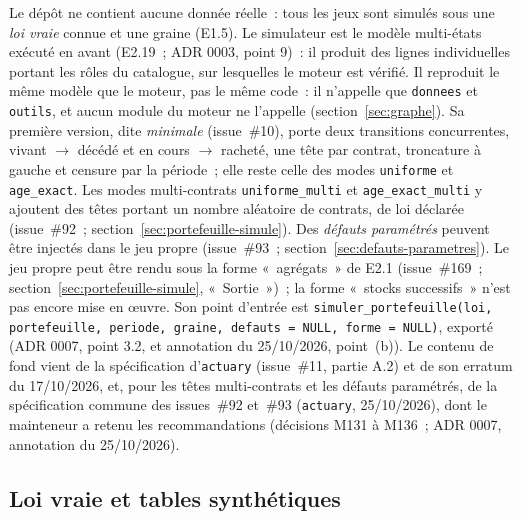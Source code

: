 \documentclass[a4paper,11pt]{article}
\newcommand{\code}[1]{\texttt{\small #1}}
\begin{document}
Le dépôt ne contient aucune donnée réelle~: tous les jeux sont simulés sous
une \emph{loi vraie} connue et une graine (E1.5). Le simulateur est le modèle
multi-états exécuté en avant (E2.19~; ADR 0003, point 9)~: il produit des
lignes individuelles portant les rôles du catalogue, sur lesquelles le moteur
est vérifié. Il reproduit le même modèle que le moteur, pas le même code~: il
n'appelle que \code{donnees} et \code{outils}, et aucun module du moteur ne
l'appelle (section~\ref{sec:graphe}). Sa première version, dite
\emph{minimale} (issue~\#10), porte deux transitions concurrentes, vivant
$\to$ décédé et en cours $\to$ racheté, une tête par contrat, troncature à
gauche et censure par la période~; elle reste celle des modes
\code{uniforme} et \code{age\_exact}. Les modes multi-contrats
\code{uniforme\_multi} et \code{age\_exact\_multi} y ajoutent des têtes
portant un nombre aléatoire de contrats, de loi déclarée (issue~\#92~;
section~\ref{sec:portefeuille-simule}). Des \emph{défauts paramétrés}
peuvent être injectés dans le jeu propre (issue~\#93~;
section~\ref{sec:defauts-parametres}). Le jeu propre peut être rendu sous
la forme «~agrégats~» de E2.1 (issue~\#169~;
section~\ref{sec:portefeuille-simule}, «~Sortie~»)~; la forme «~stocks
successifs~» n'est pas encore mise en œuvre. Son point
d'entrée est \code{simuler\_portefeuille(loi, portefeuille, periode,
graine, defauts = NULL, forme = NULL)}, exporté (ADR 0007, point 3.2, et annotation du
25/10/2026, point~(b)). Le contenu de fond vient de la
spécification d'\code{actuary} (issue~\#11, partie A.2) et de son erratum du
17/10/2026, et, pour les têtes multi-contrats et les défauts paramétrés,
de la spécification commune
des issues~\#92 et~\#93 (\code{actuary}, 25/10/2026), dont le mainteneur a
retenu les recommandations (décisions M131 à M136~; ADR 0007, annotation du
25/10/2026).

\subsection{Loi vraie et tables synthétiques}
\label{sec:loi-vraie}
\end{document}
